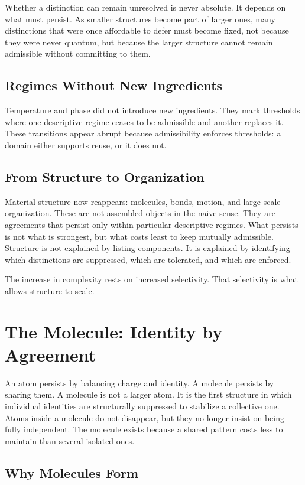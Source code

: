 \documentclass[11pt,twoside,openright]{book}
\begin{document}
Whether a distinction can remain unresolved is never absolute. It depends on what must persist. As smaller structures become part of larger ones, many distinctions that were once affordable to defer must become fixed, not because they were never quantum, but because the larger structure cannot remain admissible without committing to them.

\section*{Regimes Without New Ingredients}

Temperature and phase did not introduce new ingredients. They mark thresholds where one descriptive regime ceases to be admissible and another replaces it. These transitions appear abrupt because admissibility enforces thresholds: a domain either supports reuse, or it does not.

\section*{From Structure to Organization}

Material structure now reappears: molecules, bonds, motion, and large-scale organization. These are not assembled objects in the naive sense. They are agreements that persist only within particular descriptive regimes. What persists is not what is strongest, but what costs least to keep mutually admissible. Structure is not explained by listing components. It is explained by identifying which distinctions are suppressed, which are tolerated, and which are enforced.

The increase in complexity rests on increased selectivity. That selectivity is what allows structure to scale.

\chapter{The Molecule: Identity by Agreement}

An atom persists by balancing charge and identity. A molecule persists by sharing them. A molecule is not a larger atom. It is the first structure in which individual identities are structurally suppressed to stabilize a collective one. Atoms inside a molecule do not disappear, but they no longer insist on being fully independent. The molecule exists because a shared pattern costs less to maintain than several isolated ones.

\section*{Why Molecules Form}
\end{document}
